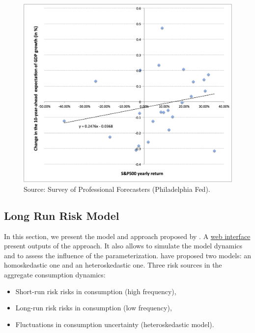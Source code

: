 \documentclass[
  12pt,
]{book}
\providecommand{\tightlist}{%
  \setlength{\itemsep}{0pt}\setlength{\parskip}{0pt}}
\theoremstyle{definition}
\theoremstyle{definition}
\theoremstyle{definition}
\theoremstyle{definition}
\theoremstyle{remark}
\begin{document}
\begin{figure}

{\centering \includegraphics[width=1\linewidth]{figures/Figure_Stock_chge_expect} 

}

\caption{Source: Survey of Professional Forecasters (Philadelphia Fed).}\label{fig:SPF10yrStock}
\end{figure}

\hypertarget{long-run-risk-model}{%
\subsection{Long Run Risk Model}\label{long-run-risk-model}}

In this section, we present the model and approach proposed by \citet{Bansal_Yaron_2004}.
A \href{https://jrenne.shinyapps.io/LRRModels}{web interface} present outputs of the approach. It also allows to simulate the model dynamics and to assess the influence of the parameterization. \citet{Bansal_Yaron_2004} have proposed two models: an homoskedastic one and an heteroskedastic one. Three risk sources in the aggregate consumption dynamics:

\begin{itemize}
\tightlist
\item
  Short-run risk risks in consumption (high frequency),
\item
  Long-run risk risks in consumption (low frequency),
\item
  Fluctuations in consumption uncertainty (heteroskedastic model).
\end{itemize}
\end{document}
